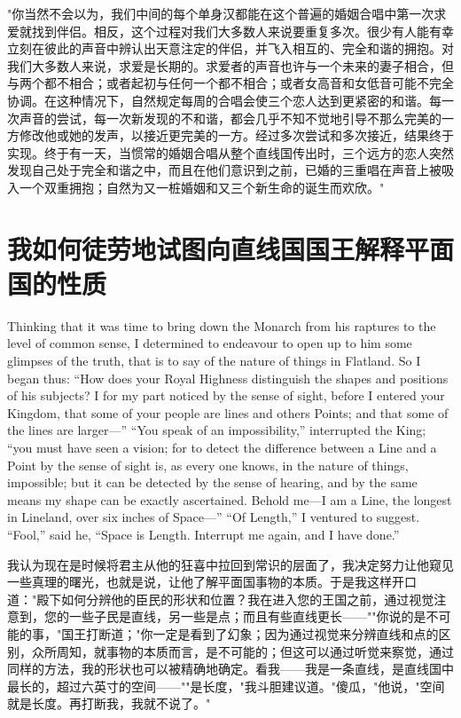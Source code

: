 \documentclass[12pt,UTF8]{ctexbook}
\begin{document}
"你当然不会以为，我们中间的每个单身汉都能在这个普遍的婚姻合唱中第一次求爱就找到伴侣。相反，这个过程对我们大多数人来说要重复多次。很少有人能有幸立刻在彼此的声音中辨认出天意注定的伴侣，并飞入相互的、完全和谐的拥抱。对我们大多数人来说，求爱是长期的。求爱者的声音也许与一个未来的妻子相合，但与两个都不相合；或者起初与任何一个都不相合；或者女高音和女低音可能不完全协调。在这种情况下，自然规定每周的合唱会使三个恋人达到更紧密的和谐。每一次声音的尝试，每一次新发现的不和谐，都会几乎不知不觉地引导不那么完美的一方修改他或她的发声，以接近更完美的一方。经过多次尝试和多次接近，结果终于实现。终于有一天，当惯常的婚姻合唱从整个直线国传出时，三个远方的恋人突然发现自己处于完全和谐之中，而且在他们意识到之前，已婚的三重唱在声音上被吸入一个双重拥抱；自然为又一桩婚姻和又三个新生命的诞生而欢欣。"

\chapter{我如何徒劳地试图向直线国国王解释平面国的性质}

Thinking that it was time to bring down the Monarch from his raptures to the level of common sense, I determined to endeavour to open up to him some glimpses of the truth, that is to say of the nature of things in Flatland. So I began thus: ``How does your Royal Highness distinguish the shapes and positions of his subjects? I for my part noticed by the sense of sight, before I entered your Kingdom, that some of your people are lines and others Points; and that some of the lines are larger---'' ``You speak of an impossibility,'' interrupted the King; ``you must have seen a vision; for to detect the difference between a Line and a Point by the sense of sight is, as every one knows, in the nature of things, impossible; but it can be detected by the sense of hearing, and by the same means my shape can be exactly ascertained. Behold me---I am a Line, the longest in Lineland, over six inches of Space---'' ``Of Length,'' I ventured to suggest. ``Fool,'' said he, ``Space is Length. Interrupt me again, and I have done.''

我认为现在是时候将君主从他的狂喜中拉回到常识的层面了，我决定努力让他窥见一些真理的曙光，也就是说，让他了解平面国事物的本质。于是我这样开口道："殿下如何分辨他的臣民的形状和位置？我在进入您的王国之前，通过视觉注意到，您的一些子民是直线，另一些是点；而且有些直线更长——""你说的是不可能的事，"国王打断道；"你一定是看到了幻象；因为通过视觉来分辨直线和点的区别，众所周知，就事物的本质而言，是不可能的；但这可以通过听觉来察觉，通过同样的方法，我的形状也可以被精确地确定。看我——我是一条直线，是直线国中最长的，超过六英寸的空间——""是长度，"我斗胆建议道。"傻瓜，"他说，"空间就是长度。再打断我，我就不说了。"
\end{document}
